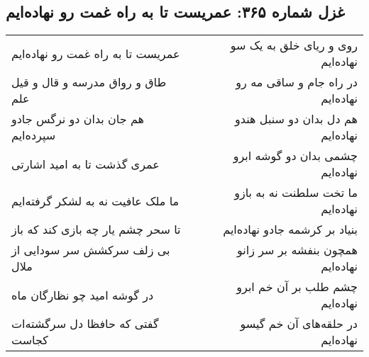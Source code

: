 \begin{center}
\section*{غزل شماره ۳۶۵: عمریست تا به راه غمت رو نهاده‌ایم}
\label{sec:sh365}
\begin{longtable}{l p{0.5cm} r}
عمریست تا به راه غمت رو نهاده‌ایم
&&
روی و ریای خلق به یک سو نهاده‌ایم
\\
طاق و رواق مدرسه و قال و قیل علم
&&
در راه جام و ساقی مه رو نهاده‌ایم
\\
هم جان بدان دو نرگس جادو سپرده‌ایم
&&
هم دل بدان دو سنبل هندو نهاده‌ایم
\\
عمری گذشت تا به امید اشارتی
&&
چشمی بدان دو گوشه ابرو نهاده‌ایم
\\
ما ملک عافیت نه به لشکر گرفته‌ایم
&&
ما تخت سلطنت نه به بازو نهاده‌ایم
\\
تا سحر چشم یار چه بازی کند که باز
&&
بنیاد بر کرشمه جادو نهاده‌ایم
\\
بی زلف سرکشش سر سودایی از ملال
&&
همچون بنفشه بر سر زانو نهاده‌ایم
\\
در گوشه امید چو نظارگان ماه
&&
چشم طلب بر آن خم ابرو نهاده‌ایم
\\
گفتی که حافظا دل سرگشته‌ات کجاست
&&
در حلقه‌های آن خم گیسو نهاده‌ایم
\\
\end{longtable}
\end{center}
